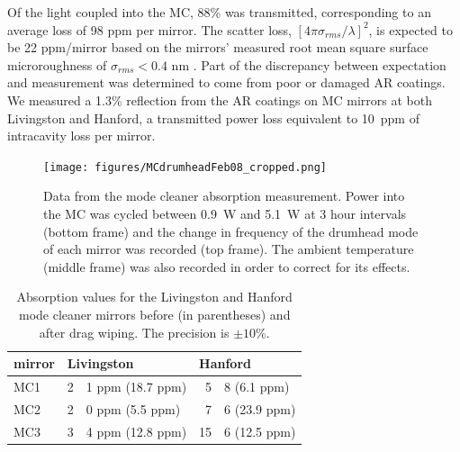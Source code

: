 Of the light coupled into the MC, 88\% was transmitted,
corresponding to an average loss of 98 ppm per mirror.  The scatter
loss, $[4 \pi \sigma_{rms} / \lambda]^2$, is expected to be 22
ppm/mirror based on the mirrors' measured root mean square surface
microroughness of $\sigma_{rms}< 0.4$ nm \cite{1998Component}. Part of
the discrepancy between expectation and measurement was determined to
come from poor or damaged AR coatings. We measured a 1.3\% reflection
from the AR coatings on MC mirrors at both Livingston and Hanford, a
transmitted power loss equivalent to 10~ppm of intracavity loss per
mirror.

\begin{figure}
\begin{centering}
\texttt{[image: figures/MCdrumheadFeb08\_cropped.png]}
\caption[Data from the mode cleaner absorption measurement]{Data from
  the mode cleaner absorption measurement. 
  Power into the MC was cycled between 0.9~W and 5.1~W at 3 hour
  intervals (bottom frame) and the change in frequency of the drumhead
  mode of each mirror was recorded (top frame). The ambient
  temperature (middle frame) was also recorded in order to correct for
  its effects.}
\label{fig:MCabsorption}
\end{centering}
\end{figure}

\begin{table}
\centering
\caption[Absorption values for the Livingston and Hanford mode
cleaner mirrors]{Absorption values for the Livingston and Hanford mode
  cleaner mirrors before (in parentheses) and after drag wiping. The precision is $\pm 10\%$.} 
\begin{tabular}{l r@{.}l r@{.}l}
\hline
mirror & \multicolumn{2}{l}{Livingston} & \multicolumn{2}{l}{Hanford}\\
\hline
MC1 & 2&1 ppm (18.7 ppm) & 5&8 (6.1 ppm) \\
MC2 & 2&0 ppm (5.5 ppm) & 7&6 (23.9 ppm) \\
MC3 & 3&4 ppm (12.8 ppm) & 15&6 (12.5 ppm) \\
\hline
\end{tabular}
\label{tab:MCabsorption2}
\end{table}

